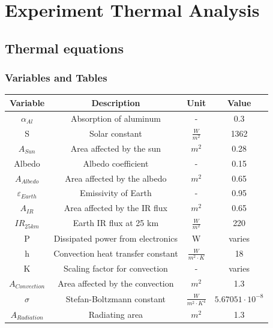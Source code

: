 \newpage
\color{blue}
\section{Experiment Thermal Analysis} \label{sec:appI}

\subsection{Thermal equations}

\subsubsection{Variables and Tables}
\begin{table}[H]
    \centering
    {\color{blue}\begin{tabular}{|c|c|c|c|}
        \hline
        \textbf{Variable} & \textbf{Description} & \textbf{Unit} & \textbf{Value} \\ \hline
        $\alpha_{Al}$ & Absorption of aluminum & - & 0.3 \\ \hline
        S & Solar constant & $\frac{W}{m^2}$ & 1362 \\ \hline
        $A_{Sun}$ & Area affected by the sun & $m^2$ & 0.28 \\ \hline
        Albedo & Albedo coefficient & - & 0.15 \\ \hline
        $A_{Albedo}$ & Area affected by the albedo & $m^2$ & 0.65 \\ \hline
        $\varepsilon_{Earth}$ & Emissivity of Earth & - & 0.95 \\ \hline
        $A_{IR}$ & Area affected by the IR flux & $m^2$ & 0.65 \\ \hline
        $IR_{25km}$ & Earth IR flux at 25 km & $\frac{W}{m^2}$ & 220 \\ \hline
        P & Dissipated power from electronics & W & varies \\ \hline
        h & Convection heat transfer constant & $\frac{W}{m^2 \cdot K}$ & 18 \\ \hline
        K & Scaling factor for convection & - & varies \\ \hline
        $A_{Convection}$ & Area affected by the convection & $m^2$ & 1.3 \\ \hline
        $\sigma$ & Stefan-Boltzmann constant & $\frac{W}{m^2 \cdot K^4}$ & $5.67051 \cdot 10^{-8}$ \\ \hline
        $A_{Radiation}$ & Radiating area & $m^2$ & 1.3\\ \hline

\end{tabular}}
\end{table}
